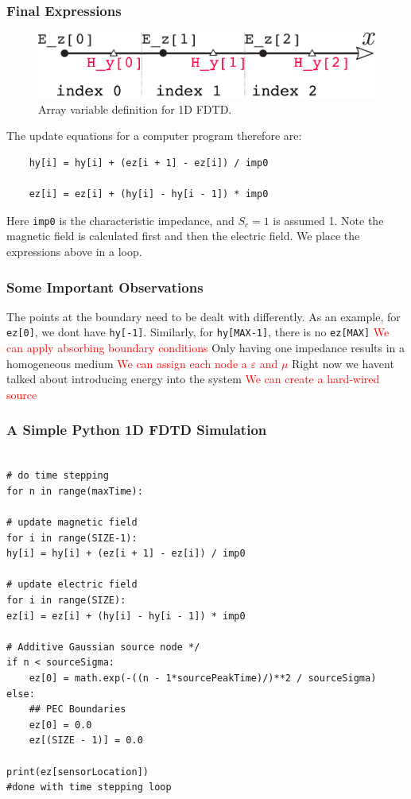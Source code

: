 \documentclass[10pt]{beamer}
\newcommand{\E}{\varepsilon}  %
\renewcommand{\u}{\mu}  %
\begin{document}
\begin{frame}[fragile]
    \frametitle{Final Expressions}
    \begin{figure}[h!]
        \centering
        \includegraphics[width=.7\textwidth]{code_fdtd_1d.pdf}
        \caption{Array variable definition for 1D FDTD.}
    \end{figure}
    The update equations for a computer program therefore are:
    \begin{verbatim}
    hy[i] = hy[i] + (ez[i + 1] - ez[i]) / imp0

    ez[i] = ez[i] + (hy[i] - hy[i - 1]) * imp0
\end{verbatim}
    Here \texttt{imp0} is the characteristic impedance, and $S_c = 1$ is assumed 1. Note the magnetic field is calculated first and then the electric field. We place the expressions above in a loop.
\end{frame}


\begin{frame}
    \frametitle{Some Important Observations}

    \begin{outline}
        \1 The points at the boundary need to be dealt with differently. As an example,
        for \texttt{ez[0]}, we dont have        \texttt{hy[-1]}.
        \2 Similarly, for \texttt{hy[MAX-1]}, there is no \texttt{ez[MAX]}
        \2 \textcolor{red}{We can apply absorbing boundary conditions}
        \1 Only having one impedance results in a homogeneous medium
        \2 \textcolor{red}{We can assign each node a $\E$ and $\u$}
        \1 Right now we havent talked about introducing energy into the system
        \2 \textcolor{red}{We can create a hard-wired source}
    \end{outline}

\end{frame}

\begin{frame}[fragile]
    \frametitle{A Simple Python 1D FDTD Simulation}
    \scriptsize
    \begin{verbatim}

# do time stepping
for n in range(maxTime):

# update magnetic field
for i in range(SIZE-1):
hy[i] = hy[i] + (ez[i + 1] - ez[i]) / imp0

# update electric field
for i in range(SIZE):
ez[i] = ez[i] + (hy[i] - hy[i - 1]) * imp0

# Additive Gaussian source node */
if n < sourceSigma:
    ez[0] = math.exp(-((n - 1*sourcePeakTime)/)**2 / sourceSigma)
else:
    ## PEC Boundaries
    ez[0] = 0.0
    ez[(SIZE - 1)] = 0.0

print(ez[sensorLocation])
#done with time stepping loop
    \end{verbatim}

\end{frame}
\end{document}
